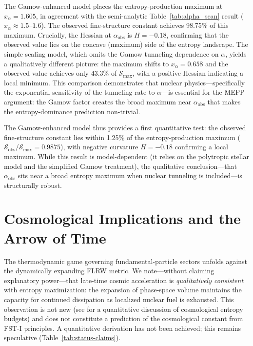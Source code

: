 \documentclass[12pt,a4paper]{article}
\theoremstyle{remark}
\begin{document}
The Gamow-enhanced model places the entropy-production maximum at $x_\alpha = 1.605$, in agreement with the semi-analytic Table~\ref{tab:alpha_scan} result ($x_\alpha \approx 1.5$--$1.6$). The observed fine-structure constant achieves 98.75\% of this maximum. Crucially, the Hessian at $\alpha_{\text{obs}}$ is $H = -0.18$, confirming that the observed value lies on the concave (maximum) side of the entropy landscape. The simple scaling model, which omits the Gamow tunneling dependence on $\alpha$, yields a qualitatively different picture: the maximum shifts to $x_\alpha = 0.658$ and the observed value achieves only 43.3\% of $\mathcal{S}_{\max}$, with a positive Hessian indicating a local minimum. This comparison demonstrates that nuclear physics---specifically the exponential sensitivity of the tunneling rate to $\alpha$---is essential for the MEPP argument: the Gamow factor creates the broad maximum near $\alpha_{\text{obs}}$ that makes the entropy-dominance prediction non-trivial.

The Gamow-enhanced model thus provides a first quantitative test: the observed fine-structure constant lies within 1.25\% of the entropy-production maximum ($\mathcal{S}_{\text{obs}}/\mathcal{S}_{\max} = 0.9875$), with negative curvature $H = -0.18$ confirming a local maximum. While this result is model-dependent (it relies on the polytropic stellar model and the simplified Gamow treatment), the qualitative conclusion---that $\alpha_{\text{obs}}$ sits near a broad entropy maximum when nuclear tunneling is included---is structurally robust.

\section{Cosmological Implications and the Arrow of Time}
\label{sec:cosmology}

The thermodynamic game governing fundamental-particle sectors unfolds against the dynamically expanding FLRW metric. We note---without claiming explanatory power---that late-time cosmic acceleration is \emph{qualitatively consistent} with entropy maximization: the expansion of phase-space volume maintains the capacity for continued dissipation as localized nuclear fuel is exhausted. This observation is not new (see \citep{EntropyMaximum} for a quantitative discussion of cosmological entropy budgets) and does not constitute a prediction of the cosmological constant from FST-I principles. A quantitative derivation has not been achieved; this remains speculative (Table~\ref{tab:status-claims}).
\end{document}
